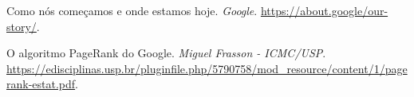 \documentclass{article}
\begin{document}
\newpage
\begin{thebibliography}{9}

 Como nós começamos e onde estamos hoje. \textit{Google}. \url{https://about.google/our-story/}.

 O algoritmo PageRank do Google. \textit{Miguel Frasson - ICMC/USP}. \url{https://edisciplinas.usp.br/pluginfile.php/5790758/mod_resource/content/1/pagerank-estat.pdf}.

\end{thebibliography}
\end{document}
